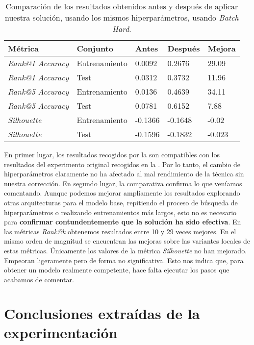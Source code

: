\begin{table}[!hbtp]
    \centering
    \begin{tabular}{|l|l|l|l|l|}
        \hline
        Métrica & Conjunto & Antes & Después & Mejora \\
        \hline
        \textit{Rank@1 Accuracy} & Entrenamiento & 0.0092 & 0.2676 & 29.09 \\
        \textit{Rank@1 Accuracy} & Test & 0.0312 & 0.3732 & 11.96  \\
        \textit{Rank@5 Accuracy} & Entrenamiento & 0.0136 & 0.4639 & 34.11 \\
        \textit{Rank@5 Accuracy} & Test & 0.0781 & 0.6152 & 7.88  \\
        \textit{Silhouette} & Entrenamiento & -0.1366 & -0.1648 & -0.02 \\
        \textit{Silhouette} & Test & -0.1596 & -0.1832 & -0.023 \\
        \hline
    \end{tabular}
    \caption{Comparación de los resultados obtenidos antes y después de aplicar nuestra solución, usando los mismos hiperparámetros, usando \textit{Batch Hard}.}
    \label{table:comparaciones_cacd_resultados}
\end{table}

En primer lugar, los resultados recogidos por la  son compatibles con los resultados del experimento original recogidos en la . Por lo tanto, el cambio de hiperparámetros claramente no ha afectado al mal rendimiento de la técnica sin nuestra corrección. En segundo lugar, la comparativa confirma lo que veníamos comentando. Aunque podemos mejorar ampliamente los resultados explorando otras arquitecturas para el modelo base, repitiendo el proceso de búsqueda de hiperparámetros o realizando entrenamientos más largos, esto no es necesario para \textbf{confirmar contundentemente que la solución ha sido efectiva}. En las métricas \textit{Rank@k} obtenemos resultados entre 10 y 29 veces mejores. En el mismo orden de magnitud se encuentran las mejoras sobre las variantes locales de estas métricas. Únicamente los valores de la métrica \textit{Silhouette} no han mejorado. Empeoran ligeramente pero de forma no significativa. Esto nos indica que, para obtener un modelo realmente competente, hace falta ejecutar los pasos que acabamos de comentar.

\section{Conclusiones extraídas de la experimentación} \label{isec:conclusiones_experimentacion}

